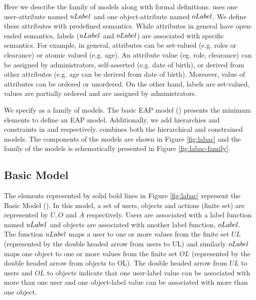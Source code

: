 \label{sec:model}


Here we describe the \eapABAC{} family of models  along with formal definitions. \eapABAC{} uses one user-attribute named $uLabel$ and one object-attribute named $oLabel$. We define these attributes with predefined semantics. While attributes in general have open-ended semantics, labels ($uLabel$ and $oLabel$) are associated with specific semantics. For example, in general, attributes can be set-valued (e.g. roles or clearance) or atomic valued (e.g. age). An attribute value (eg. role, clearance) can be assigned by administrators, self-asserted (e.g. date of birth), or derived from other attributes (e.g. age can be derived from date of birth). Moreover, value of attributes can be ordered or unordered.  On the other hand, labels are set-valued, values are partially ordered and are assigned by administrators. 



We specify \eapABAC{} as a family of models. The basic EAP model (\clabac) presents the minimum elements to define an EAP model. Additionally, we add hierarchies and constraints in \hlabac{} and  \consLabac{} respectively.  \labacOneOneOne{} combines both the hierarchical and constrained models. The components of the \eapABAC{} models are shown in Figure \ref{fig:labac} and the family of the models is schematically presented in Figure \ref{fig:labac-family}.
	
	
\subsection{Basic \eapABAC{} Model}
The elements represented by solid bold lines in Figure \ref{fig:labac} represent the Basic \eapABAC{} Model (\clabac{}). In this model, a set of users, objects and actions (finite set) are represented by $U, O$ and $A$ respectively. Users are associated with a label function named $uLabel$ and objects are associated with another label function, $oLabel$. The function $uLabel$ maps a user to one or more values from the finite set  $UL$ (represented by the double headed arrow from users to UL) and similarly $oLabel$ maps one object to one or more values from the finite set $OL$ (represented by the double headed arrow from objects to OL). The double headed arrow from $UL$  to users and $OL$ to objects indicate that one user-label value can be associated with more than one user and one object-label value can be associated with more than one object. 

